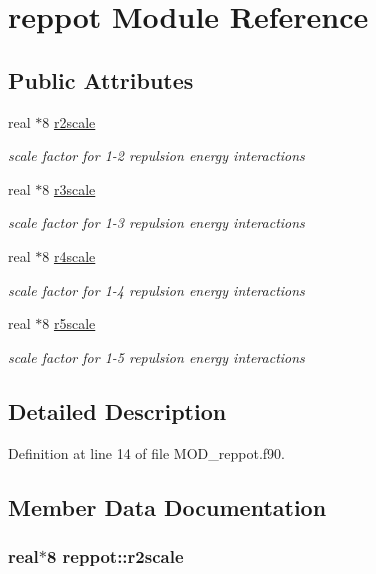 \hypertarget{classreppot}{\section{reppot Module Reference}
\label{classreppot}
}
\subsection*{Public Attributes}
\begin{DoxyCompactItemize}
\item 
real $\ast$8 \hyperlink{classreppot_af721ee8c968c3513259b4e54df8ba3e5}{r2scale}
\begin{DoxyCompactList}\small\item\em scale factor for 1-\/2 repulsion energy interactions \end{DoxyCompactList}\item 
real $\ast$8 \hyperlink{classreppot_a5fca055a7735dcb67f6d449c8056c6f3}{r3scale}
\begin{DoxyCompactList}\small\item\em scale factor for 1-\/3 repulsion energy interactions \end{DoxyCompactList}\item 
real $\ast$8 \hyperlink{classreppot_ac73340b6405f1d4bf3ee911abbdb5107}{r4scale}
\begin{DoxyCompactList}\small\item\em scale factor for 1-\/4 repulsion energy interactions \end{DoxyCompactList}\item 
real $\ast$8 \hyperlink{classreppot_adb1ef8869c6e4eb54049f0a1263d16a3}{r5scale}
\begin{DoxyCompactList}\small\item\em scale factor for 1-\/5 repulsion energy interactions \end{DoxyCompactList}\end{DoxyCompactItemize}


\subsection{Detailed Description}


Definition at line 14 of file M\-O\-D\-\_\-reppot.\-f90.



\subsection{Member Data Documentation}
\hypertarget{classreppot_af721ee8c968c3513259b4e54df8ba3e5}{
\subsubsection[{r2scale}]{\setlength{\rightskip}{0pt plus 5cm}real$\ast$8 reppot\-::r2scale}}\label{classreppot_af721ee8c968c3513259b4e54df8ba3e5}



